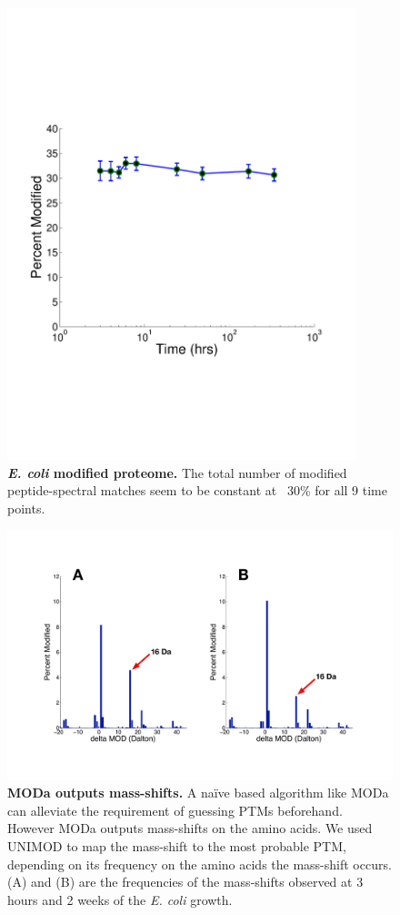 \documentclass[12pt]{article}
\begin{document}
\begin{figure}[!ht]
\centerline{\includegraphics[width=4in]{Figures/PTM_modified.pdf}}
\caption{\label{fig:ModifiedPTM}\textbf{\emph{E. coli} modified proteome.} The total number of modified peptide-spectral matches seem to be constant at ~30\% for all 9 time points.
}
\end{figure}

\clearpage
\begin{figure}[!ht]
\centerline{\includegraphics[width=8in]{Figures/PTMdalton.pdf}}
\caption{\label{fig:PTMinDalton}\textbf{MODa outputs mass-shifts.} A naïve based algorithm like MODa can alleviate the requirement of guessing PTMs beforehand. However MODa outputs mass-shifts on the amino acids. We used UNIMOD to map the mass-shift to the most probable PTM, depending on its frequency on the amino acids the mass-shift occurs. (A) and (B) are the frequencies of the mass-shifts observed  at 3 hours and 2 weeks of the \emph{E. coli} growth.}
\end{figure}
\end{document}
